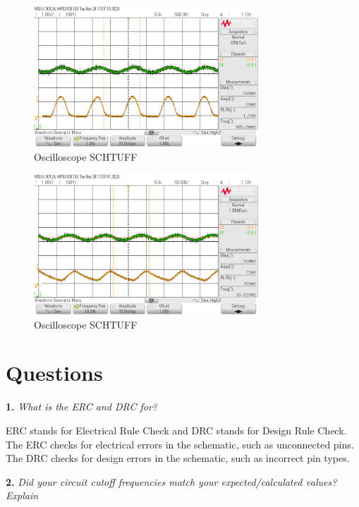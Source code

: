 \documentclass[CMPE]{KGCOEReport}
\begin{document}
\begin{figure}[H]
    \centering
    \includegraphics[width=0.75\textwidth]{1Hz.png}
    \caption{Oscilloscope SCHTUFF}
    \label{fig:1HzCapture}
\end{figure}

\begin{figure}[H]
    \centering
    \includegraphics[width=0.75\textwidth]{10Hz.png}
    \caption{Oscilloscope SCHTUFF}
    \label{fig:10HzCapture}
\end{figure}

\section*{Questions}

\textbf{1.} \emph{What is the ERC and DRC for?}

ERC stands for Electrical Rule Check and DRC stands for Design Rule Check. The ERC checks for electrical errors in the schematic, such as unconnected pins. The DRC checks for design errors in the schematic, such as incorrect pin types.

\bigskip

\textbf{2.} \emph{Did your circuit cutoff frequencies match your expected/calculated values? Explain}

\bigskip
\end{document}
